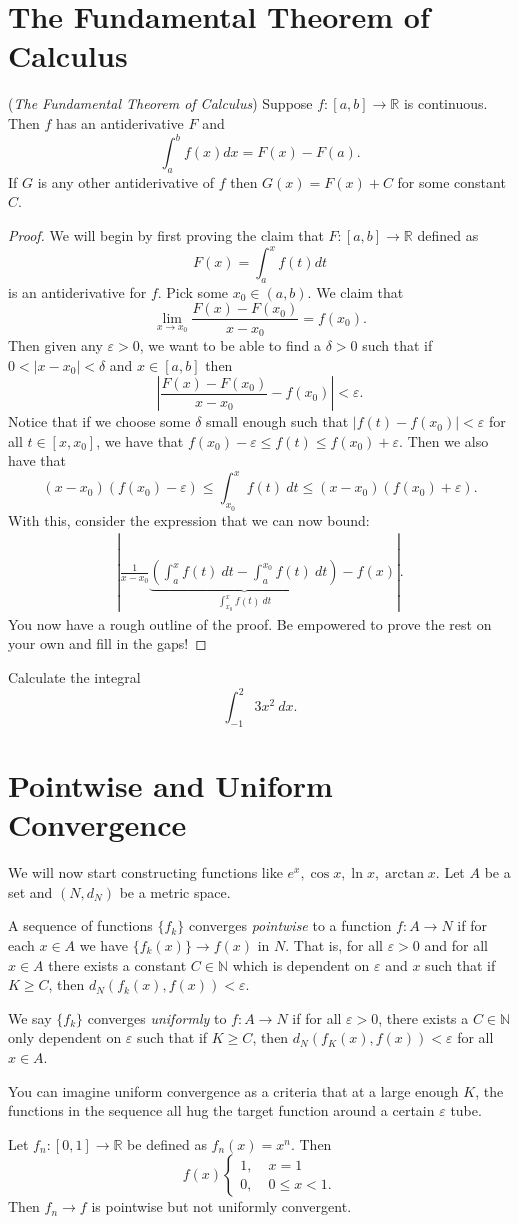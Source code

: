 \documentclass[11pt]{article}
\theoremstyle{definition}
\newcommand{\R}{\mathbb{R}}                      %
\newcommand{\N}{\mathbb{N}}
\begin{document}
\section{The Fundamental Theorem of Calculus}
\begin{shaded}
\theorem (\textit{The Fundamental Theorem of Calculus}) Suppose $f:[a,b]\to \R$ is continuous. Then $f$ has an antiderivative $F$ and 
$$
\int_a^b f(x)dx=F(x)-F(a).
$$
If $G$ is any other antiderivative of $f$ then $G(x)=F(x)+C$ for some constant $C$.
\end{shaded}
\begin{proof}
    We will begin by first proving the claim that $F:[a,b]\to \R$ defined as 
    $$
    F(x)=\int_a^x f(t)dt 
    $$
    is an antiderivative for $f$. Pick some $x_0\in (a,b)$. We claim that
    $$
    \lim_{x\to x_0} \frac{F(x)-F(x_0)}{x-x_0}=f(x_0).
    $$
    Then given any $\varepsilon>0$, we want to be able to find a $\delta>0$ such that if $0<|x-x_0|<\delta$ and $x\in[a,b]$ then 
    $$
    \left|\frac{F(x)-F(x_0)}{x-x_0}-f(x_0)\right|<\varepsilon.
    $$
    Notice that if we choose some $\delta$ small enough such that $|f(t)-f(x_0)|<\varepsilon$ for all $t\in[x,x_0]$, we have that $f(x_0)-\varepsilon\leq f(t)\leq f(x_0)+\varepsilon$. Then we also have that
    $$
    (x-x_0)(f(x_0)-\varepsilon)\leq \int_{x_0}^x f(t)~dt\leq (x-x_0)(f(x_0)+\varepsilon).
    $$
    With this, consider the expression that we can now bound:
    \begin{align*}
        \left|\frac{1}{x-x_0}\underbrace{\left(\int_a^x f(t)~dt - \int_a^{x_0} f(t)~dt\right)}_{\int_{x_0}^x f(t)~dt}-f(x)\right|.
    \end{align*}
    You now have a rough outline of the proof. Be empowered to prove the rest on your own and fill in the gaps!
\end{proof}
\ex Calculate the integral
$$
\int_{-1}^2 3x^2 ~dx.
$$
\section{Pointwise and Uniform Convergence}

We will now start constructing  functions like $e^x, \cos{x},\ln{x},\arctan{x}$. Let $A$ be a set and $(N,d_N)$ be a metric space.
\begin{mdframed}[backgroundcolor = blue!10]
\vspace{+0.2cm}
 A sequence of functions $\{f_k\}$ converges \textit{pointwise} to a function $f:A\to N$ if for each $x\in A$ we have $\{f_k(x)\}\to f(x)$ in $N$. That is, for all $\varepsilon>0$ and for all $x\in A$ there exists a constant $C\in\N$ which is dependent on $\varepsilon$ and $x$ such that if $K\geq C$, then $d_N(f_k(x),f(x))<\varepsilon$.

 We say $\{f_k\}$ converges \textit{uniformly} to $f:A\to N$ if for all $\varepsilon>0$, there exists a $C\in \N$ only dependent on $\varepsilon$ such that if $K\geq C$, then $d_N(f_K(x),f(x))<\varepsilon$ for all $x\in A$. 
\end{mdframed}
You can imagine uniform convergence as a criteria that at a large enough $K$, the functions in the sequence all hug the target function around a certain $\varepsilon$ tube. 

\ex Let $f_n:[0,1]\to \R$ be defined as $f_n(x)=x^n$. Then 
$$
f(x)\left\{\begin{aligned}
    1,\;& x=1\\
    0,\;& 0\leq x<1.
\end{aligned}\right.
$$
Then $f_n\to f$ is pointwise but not uniformly convergent.
\end{document}

